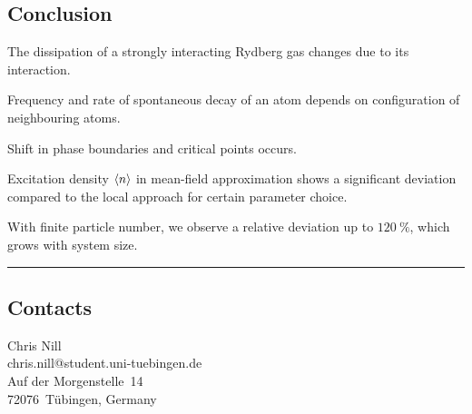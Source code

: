 \documentclass[a0,plainsections]{sciposter}
\begin{document}
\begin{multicols}{2}
	\section{Conclusion}
	\begin{AutoMultiColItemize}
		\renewcommand\labelitemi{\textcolor{rot}{$\rightarrow$}}
		\item The dissipation of a strongly interacting Rydberg gas changes due to its interaction.
		\item Frequency and rate of spontaneous decay of an atom depends on configuration of neighbouring atoms.
		\item Shift in phase boundaries and critical points occurs.
		\item Excitation density $\expval{n}$ in mean-field approximation shows a significant deviation compared to the local approach for certain parameter choice.
		\item With finite particle number, we observe a relative deviation up to $\SI{120}{\percent}$, which grows with system size.
	\end{AutoMultiColItemize}
\end{multicols}

\vspace*{-10pt}
\textcolor{rot}{\rule{\textwidth}{4pt}}
\setlength{\columnseprule}{0pt}
\begin{multicols}{2}
	\vspace*{-70pt}
	\printbibliography[heading=customBibTitle]
	\vspace*{-10pt}

	\section*{Contacts}
	{\small
		Chris Nill\\
		chris.nill@student.uni-tuebingen.de\\
		Auf der Morgenstelle~14\\
		72076~Tübingen, Germany
	}
\end{multicols}
\end{document}
